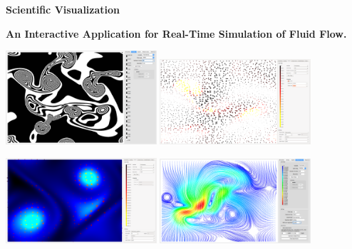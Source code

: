 
\hypersetup{pageanchor=false}
\begin{titlepage}
    \centering
    \par\vspace{9cm}
          
    \par\vspace{3cm}
    {\huge\bfseries  Scientific Visualization \par}
    {\large\bfseries  An Interactive Application for Real-Time Simulation of Fluid Flow.\par}

    \vspace{2cm}\par
        \includegraphics[width=0.42\textwidth, height=0.5\textheight, keepaspectratio=true]{img/titlepage/smoke.png} \hspace{10px}
        \includegraphics[width=0.42\textwidth, height=0.5\textheight, keepaspectratio=true]{img/titlepage/glyphs.png}

        \vspace{10px}
        \includegraphics[width=0.42\textwidth, height=0.5\textheight, keepaspectratio=true]{img/titlepage/gradient.png} \hspace{10px}
        \includegraphics[width=0.42\textwidth, height=0.5\textheight, keepaspectratio=true]{img/titlepage/streamlines.png}


\end{titlepage}
